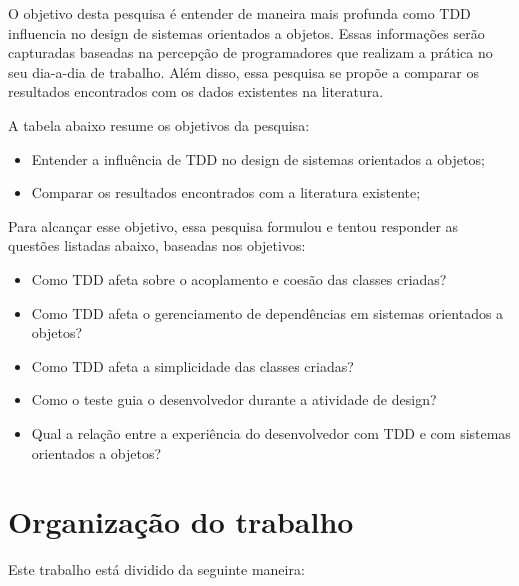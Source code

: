 O objetivo desta pesquisa é entender de maneira mais profunda como TDD
influencia no design de sistemas orientados a objetos. Essas informações serão
capturadas baseadas na percepção de programadores que realizam a prática no seu
dia-a-dia de trabalho. Além disso, essa pesquisa se propõe a comparar os
resultados encontrados com os dados existentes na literatura.

A tabela abaixo resume os objetivos da pesquisa:

\begin{itemize}
  \item Entender a influência de TDD no design de sistemas orientados a objetos;

  \item Comparar os resultados encontrados com a literatura existente;
\end{itemize}

Para alcançar esse objetivo, essa pesquisa formulou e tentou responder as
questões listadas abaixo, baseadas nos objetivos:

\begin{itemize}
  \item Como TDD afeta sobre o acoplamento e coesão das classes
  criadas?
  
  \item Como TDD afeta o gerenciamento de dependências em sistemas orientados a
  objetos?

  \item Como TDD afeta a simplicidade das classes criadas?

  \item Como o teste guia o desenvolvedor durante a atividade de
  design?

  \item Qual a relação entre a experiência do desenvolvedor com TDD e
  com sistemas orientados a objetos?
\end{itemize}

\section{Organização do trabalho}

Este trabalho está dividido da seguinte maneira: 


